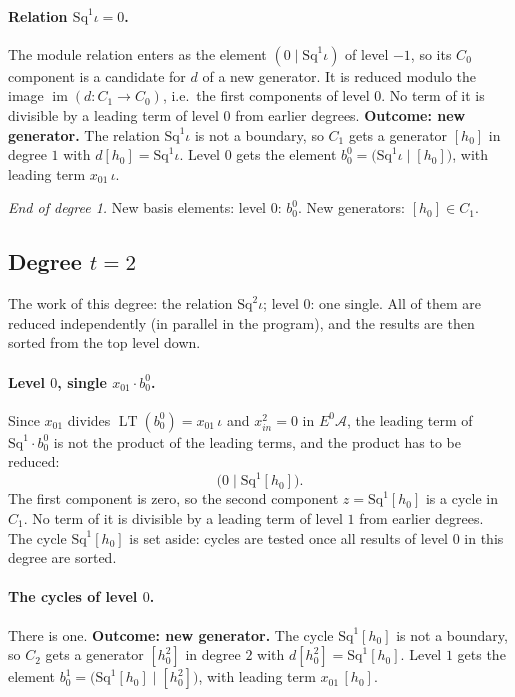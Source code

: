 \documentclass[11pt]{article}
\newcommand{\Sq}{\mathrm{Sq}}
\newcommand{\A}{\mathcal{A}}
\DeclareMathOperator{\LT}{LT}
\begin{document}
\paragraph{Relation $\Sq^{1}\iota = 0$.} The module relation enters as the element $(0 \mid \Sq^{1}\iota)$ of level $-1$, so its $C_0$ component is a candidate for $d$ of a new generator. It is reduced modulo the image $\operatorname{im}(d\colon C_1\to C_0)$, i.e.\ the first components of level $0$.
No term of it is divisible by a leading term of level $0$ from earlier degrees.
\textbf{Outcome: new generator.} The relation $\Sq^{1}\iota$ is not a boundary, so $C_{1}$ gets a generator $[h_0]$ in degree $1$ with $d[h_0] = \Sq^{1}\iota$.
Level $0$ gets the element $b^{0}_{0} = \bigl(\Sq^{1}\iota \;\big|\; [h_0]\bigr)$, with leading term $x_{01}\,\iota$.
\medskip
\par\noindent\emph{End of degree 1.} New basis elements: level $0$: $b^{0}_{0}$. New generators: $[h_0]\in C_{1}$.
\subsection*{Degree $t = 2$}
\noindent The work of this degree: the relation $\Sq^{2}\iota$; level $0$: one single. All of them are reduced independently (in parallel in the program), and the results are then sorted from the top level down.
\medskip
\paragraph{Level $0$, single $x_{01}\cdot b^{0}_{0}$.} Since $x_{01}$ divides $\LT(b^{0}_{0}) = x_{01}\,\iota$ and $x_{in}^2 = 0$ in $E^0\A$, the leading term of $\Sq^{1}\cdot b^{0}_{0}$ is not the product of the leading terms, and the product has to be reduced:
\[\bigl(0 \;\big|\; \Sq^{1}[h_0]\bigr).\]
The first component is zero, so the second component $z = \Sq^{1}[h_0]$ is a cycle in $C_{1}$.
No term of it is divisible by a leading term of level $1$ from earlier degrees.
The cycle $\Sq^{1}[h_0]$ is set aside: cycles are tested once all results of level $0$ in this degree are sorted.
\medskip
\paragraph{The cycles of level $0$.} There is one.
\textbf{Outcome: new generator.} The cycle $\Sq^{1}[h_0]$ is not a boundary, so $C_{2}$ gets a generator $[h_0^2]$ in degree $2$ with $d[h_0^2] = \Sq^{1}[h_0]$.
Level $1$ gets the element $b^{1}_{0} = \bigl(\Sq^{1}[h_0] \;\big|\; [h_0^2]\bigr)$, with leading term $x_{01}\,[h_0]$.
\medskip
\end{document}
